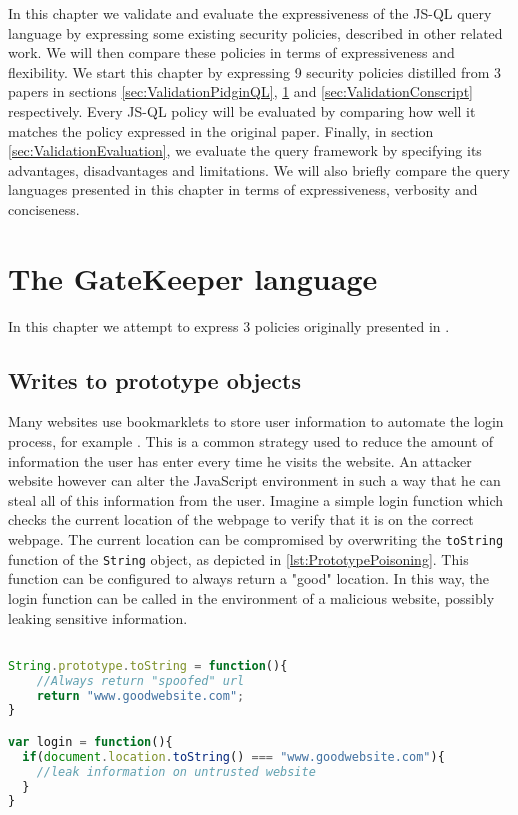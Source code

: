 In this chapter we validate and evaluate the expressiveness of the JS-QL query language by expressing some existing security policies, described in other related work. We will then compare these policies in terms of expressiveness and flexibility. %
We start this chapter by expressing 9 security policies distilled from 3 papers in sections \ref{sec:ValidationPidginQL}, \ref{sec:ValidationGK} and \ref{sec:ValidationConscript} respectively. Every JS-QL policy will be evaluated by comparing how well it matches the policy expressed in the original paper. Finally, in section \ref{sec:ValidationEvaluation}, we evaluate the query framework by specifying its advantages, disadvantages and limitations. We will also briefly compare the query languages presented in this chapter in terms of expressiveness, verbosity and conciseness.
\section{The GateKeeper language}
\label{sec:ValidationGK}

In this chapter we attempt to express 3 policies originally presented in \cite{GateKeeper}.

\subsection{Writes to prototype objects}

Many websites use bookmarklets to store user information to automate the login process, for example \cite{PrototypePoisoning}. This is a common strategy used to reduce the amount of information the user has enter every time he visits the website. An attacker website however can alter the JavaScript environment in such a way that he can steal all of this information from the user. Imagine a simple login function which checks the current location of the webpage to verify that it is on the correct webpage. The current location can be compromised by overwriting the \texttt{toString} function of the \texttt{String} object, as depicted in \ref{lst:PrototypePoisoning}. This function can be configured to always return a "good" location. In this way, the login function can be called in the environment of a malicious website, possibly leaking sensitive information.

\begin{lstlisting}[label={lst:PrototypePoisoning},language=JavaScript,caption=Prototype poisoning example,mathescape=true]  % float=t?

String.prototype.toString = function(){
    //Always return "spoofed" url
    return "www.goodwebsite.com";
}

var login = function(){
  if(document.location.toString() === "www.goodwebsite.com"){
    //leak information on untrusted website
  }
}
\end{lstlisting}

